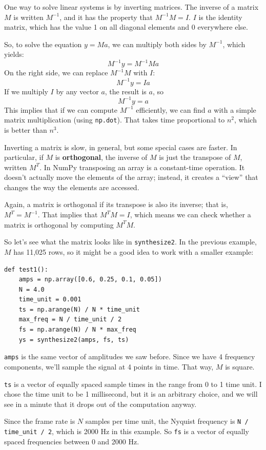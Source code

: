 \documentclass[12pt]{book}
\begin{document}
One way to solve linear systems is by inverting matrices.  The
inverse of a matrix $M$ is written $M^{-1}$, and it has the property
that $M^{-1}M = I$.  $I$ is the identity matrix, which has
the value 1 on all diagonal elements and 0 everywhere else.

So, to solve the equation $y = Ma$, we can multiply both sides by
$M^{-1}$, which yields:
%
\[ M^{-1}y = M^{-1} M a \]
%
On the right side, we can replace $M^{-1}M$ with $I$:
%
\[ M^{-1}y = I a \]
%
If we multiply $I$ by any vector $a$, the result is $a$, so
%
\[ M^{-1}y = a \]
%
This implies that if we can compute $M^{-1}$ efficiently, we can find
$a$ with a simple matrix multiplication (using {\tt np.dot}).  That
takes time proportional to $n^2$, which is better than $n^3$.

Inverting a matrix is slow, in general, but some special cases are
faster.  In particular, if $M$ is {\bf orthogonal}, the inverse of $M$
is just the transpose of $M$, written $M^T$.  In NumPy
transposing an array is a constant-time operation.  It
doesn't actually move the elements of the array; instead, it creates a
``view'' that changes the way the elements are accessed.

Again, a matrix is orthogonal if its transpose is also its inverse;
that is, $M^T = M^{-1}$.  That implies that $M^TM = I$, which means we
can check whether a matrix is orthogonal by computing $M^TM$.

So let's see what the matrix looks like in {\tt synthesize2}.  In
the previous example, $M$ has 11,025 rows, so it might be a good idea
to work with a smaller example:

\begin{verbatim}
def test1():
    amps = np.array([0.6, 0.25, 0.1, 0.05])
    N = 4.0
    time_unit = 0.001
    ts = np.arange(N) / N * time_unit
    max_freq = N / time_unit / 2
    fs = np.arange(N) / N * max_freq
    ys = synthesize2(amps, fs, ts)
\end{verbatim}

{\tt amps} is the same vector of amplitudes we saw before.
Since we have 4 frequency components, we'll sample the signal
at 4 points in time.  That way, $M$ is square.

{\tt ts} is a vector of equally spaced sample times in the range from
0 to 1 time unit.  I chose the time unit to be 1 millisecond, but it
is an arbitrary choice, and we will see in a minute that it drops out
of the computation anyway.

Since the frame rate is $N$ samples per time unit, the Nyquist
frequency is \verb"N / time_unit / 2", which is 2000 Hz in this
example.  So {\tt fs} is a vector of equally spaced frequencies
between 0 and 2000 Hz.
\end{document}
